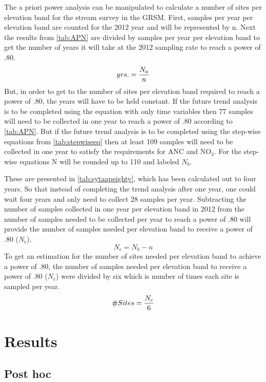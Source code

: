 The a priori power analysis can be manipulated to calculate a number of sites per elevation band for the stream survey in the GRSM.
First, samples per year per elevation band are counted for the 2012 year and will be represented by n.
Next the results from \autoref{tab:APN} are divided by samples per year per elevation band to get the number of years it will take at the 2012 sampling rate to reach a power of .80.
\begin{equation} \label{eq:yrs}
	yrs. = {N_a \over n}
\end{equation}
But, in order to get to the number of sites per elevation band required to reach a power of .80, the years will have to be held constant.
If the future trend analysis is to be completed using the equation with only time variables then 77 samples will need to be collected in one year to reach a power of .80 according to \autoref{tab:APN}.
But if the future trend analysis is to be completed using the step-wise equations from \autoref{tab:stepwiseeq} then at least 109 samples will need to be collected in one year to satisfy the requirements for ANC and NO$_3$.
For the step-wise equations N will be rounded up to 110 and labeled $N_b$.

These are presented in \autoref{tab:sytaapeighty}, which has been calculated out to four years.
So that instead of completing the trend analysis after one year, one could wait four years and only need to collect 28 samples per year.
Subtracting the number of samples collected in one year per elevation band in 2012 from the number of samples needed to be collected per year to reach a power of .80 will provide the number of samples needed per elevation band to receive a power of .80 ($N_c$).
\begin{equation} \label{eq:Nc}
	N_c={N_b - n}
\end{equation}
To get an estimation for the number of sites needed per elevation band to achieve a power of .80, the number of samples needed per elevation band to receive a power of .80 ($N_c$) were divided by six which is number of times each site is sampled per year.
\begin{equation}\label{eq:sites}
	\#Sites = {N_c \over 6}
\end{equation}

\section{Results}

\subsection{Post hoc}

